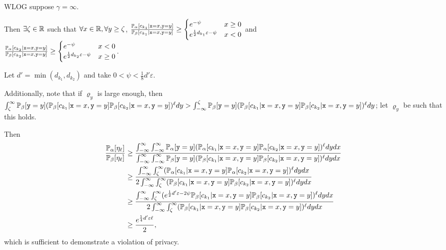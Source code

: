 WLOG suppose $\gamma = \infty$. 

Then $\exists \zeta\in \mathbb{R}$ such that $\forall x\in \mathbb{R}, \forall y\geq \zeta$, $\frac{\mathbb{P}_\alpha[c_{k_1}|\texttt{x}=x, \texttt{y}=y]}{\mathbb{P}_\beta[c_{k_1}|\texttt{x}=x, \texttt{y}=y]}\geq\begin{cases}
	e^{-\psi} & x\geq 0\\
	e^{\frac{1}{2}d_{k_1}\varepsilon-\psi} & x<0
\end{cases}$ and \\ $\frac{\mathbb{P}_\alpha[c_{k_2}|\texttt{x}=x, \texttt{y}=y]}{\mathbb{P}_\beta[c_{k_2}|\texttt{x}=x, \texttt{y}=y]}\geq\begin{cases}
	e^{-\psi} & x< 0\\
	e^{\frac{1}{2}d_{k_2}\varepsilon-\psi} & x\geq 0
\end{cases}$.

Let $d' = \min(d_{k_1}, d_{k_2})$ and take $0<\psi < \frac{1}{8}d'\varepsilon$.

Additionally, note that if $\varrho_y$ is large enough, then $\int_{\zeta}^\infty \mathbb{P}_\beta[\texttt{y}=y](\mathbb{P}_\beta[c_{k_1}|\texttt{x}=x, \texttt{y}=y]\mathbb{P}_\beta[c_{k_2}|\texttt{x}=x, \texttt{y}=y])^\ell dy > \int_{-\infty}^\zeta\mathbb{P}_\beta[\texttt{y}=y](\mathbb{P}_\beta[c_{k_1}|\texttt{x}=x, \texttt{y}=y]\mathbb{P}_\beta[c_{k_2}|\texttt{x}=x, \texttt{y}=y])^\ell dy$; let $\varrho_y$ be such that this holds. 

Then \begin{align*}
	\frac{\mathbb{P}_\alpha[\eta_\ell]}{\mathbb{P}_\beta[\eta_\ell]}&\geq \frac{\int_{-\infty}^\infty\int_{-\infty}^\infty \mathbb{P}_\alpha[\texttt{y}=y](\mathbb{P}_\alpha[c_{k_1}|\texttt{x}=x, \texttt{y}=y]\mathbb{P}_\alpha[c_{k_2}|\texttt{x}=x, \texttt{y}=y])^\ell dydx}{\int_{-\infty}^\infty\int_{-\infty}^\infty \mathbb{P}_\beta[\texttt{y}=y](\mathbb{P}_\beta[c_{k_1}|\texttt{x}=x, \texttt{y}=y]\mathbb{P}_\beta[c_{k_2}|\texttt{x}=x, \texttt{y}=y])^\ell dydx}\\
	&\geq \frac{\int_{-\infty}^\infty\int_{\zeta}^\infty (\mathbb{P}_\alpha[c_{k_1}|\texttt{x}=x, \texttt{y}=y]\mathbb{P}_\alpha[c_{k_2}|\texttt{x}=x, \texttt{y}=y])^\ell dydx}{2\int_{-\infty}^\infty\int_{\zeta}^\infty(\mathbb{P}_\beta[c_{k_1}|\texttt{x}=x, \texttt{y}=y]\mathbb{P}_\beta[c_{k_2}|\texttt{x}=x, \texttt{y}=y])^\ell dydx}\\
	&\geq \frac{\int_{-\infty}^\infty\int_{\zeta}^\infty (e^{\frac{1}{2}d'\varepsilon-2\psi}\mathbb{P}_\beta[c_{k_1}|\texttt{x}=x, \texttt{y}=y]\mathbb{P}_\beta[c_{k_2}|\texttt{x}=x, \texttt{y}=y])^\ell dydx}{2\int_{-\infty}^\infty\int_{\zeta}^\infty(\mathbb{P}_\beta[c_{k_1}|\texttt{x}=x, \texttt{y}=y]\mathbb{P}_\beta[c_{k_2}|\texttt{x}=x, \texttt{y}=y])^\ell dydx}\\
	&\geq \frac{e^{\frac{1}{4}d'\varepsilon\ell}}{2},
\end{align*}
which is sufficient to demonstrate a violation of privacy. 



